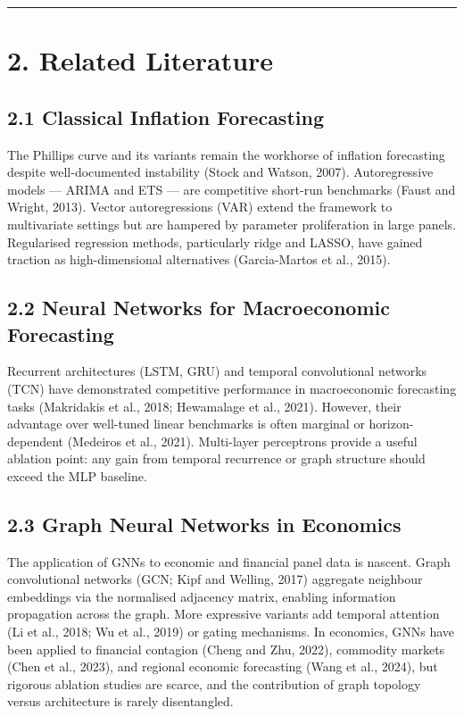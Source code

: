 \documentclass[
  11pt,
  a4paper]{article}
\begin{document}
\begin{center}\rule{0.5\linewidth}{0.5pt}\end{center}

\section{2. Related Literature}\label{related-literature}

\subsection{2.1 Classical Inflation
Forecasting}\label{classical-inflation-forecasting}

The Phillips curve and its variants remain the workhorse of inflation
forecasting despite well-documented instability (Stock and Watson,
2007). Autoregressive models --- ARIMA and ETS --- are competitive
short-run benchmarks (Faust and Wright, 2013). Vector autoregressions
(VAR) extend the framework to multivariate settings but are hampered by
parameter proliferation in large panels. Regularised regression methods,
particularly ridge and LASSO, have gained traction as high-dimensional
alternatives (Garcia-Martos et al., 2015).

\subsection{2.2 Neural Networks for Macroeconomic
Forecasting}\label{neural-networks-for-macroeconomic-forecasting}

Recurrent architectures (LSTM, GRU) and temporal convolutional networks
(TCN) have demonstrated competitive performance in macroeconomic
forecasting tasks (Makridakis et al., 2018; Hewamalage et al., 2021).
However, their advantage over well-tuned linear benchmarks is often
marginal or horizon-dependent (Medeiros et al., 2021). Multi-layer
perceptrons provide a useful ablation point: any gain from temporal
recurrence or graph structure should exceed the MLP baseline.

\subsection{2.3 Graph Neural Networks in
Economics}\label{graph-neural-networks-in-economics}

The application of GNNs to economic and financial panel data is nascent.
Graph convolutional networks (GCN; Kipf and Welling, 2017) aggregate
neighbour embeddings via the normalised adjacency matrix, enabling
information propagation across the graph. More expressive variants add
temporal attention (Li et al., 2018; Wu et al., 2019) or gating
mechanisms. In economics, GNNs have been applied to financial contagion
(Cheng and Zhu, 2022), commodity markets (Chen et al., 2023), and
regional economic forecasting (Wang et al., 2024), but rigorous ablation
studies are scarce, and the contribution of graph topology versus
architecture is rarely disentangled.
\end{document}
